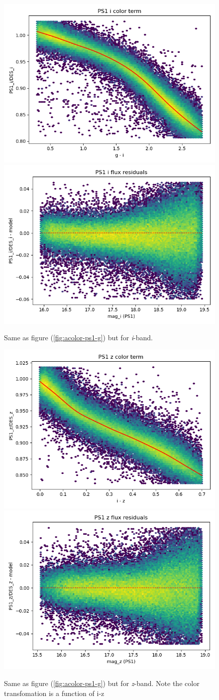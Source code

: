 \begin{figure}
    \includegraphics[width=0.49\linewidth]{./figures/color_terms/PS1_to_DES_band_i_color_term.png}
    \includegraphics[width=0.49\linewidth]{./figures/color_terms/PS1_to_DES_band_i_flux_residuals.png}
    \caption{Same as figure (\ref{fig:acolor-ps1-g}) but for \textit{i}-band.}
\end{figure}
\begin{figure}
    \includegraphics[width=0.49\linewidth]{./figures/color_terms/PS1_to_DES_band_z_color_term.png}
    \includegraphics[width=0.49\linewidth]{./figures/color_terms/PS1_to_DES_band_z_flux_residuals.png}
    \caption{Same as figure (\ref{fig:acolor-ps1-g}) but for \textit{z}-band. Note the color transfomation is a function of i-z}
\end{figure}
